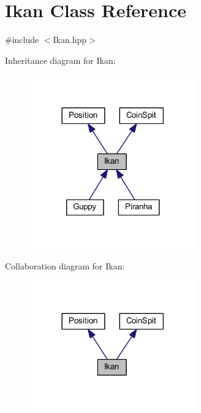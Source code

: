 \hypertarget{class_ikan}{}\section{Ikan Class Reference}
\label{class_ikan}


{\ttfamily \#include $<$Ikan.\+hpp$>$}



Inheritance diagram for Ikan\+:\nopagebreak
\begin{figure}[H]
\begin{center}
\leavevmode
\includegraphics[width=204pt]{class_ikan__inherit__graph}
\end{center}
\end{figure}


Collaboration diagram for Ikan\+:\nopagebreak
\begin{figure}[H]
\begin{center}
\leavevmode
\includegraphics[width=204pt]{class_ikan__coll__graph}
\end{center}
\end{figure}

